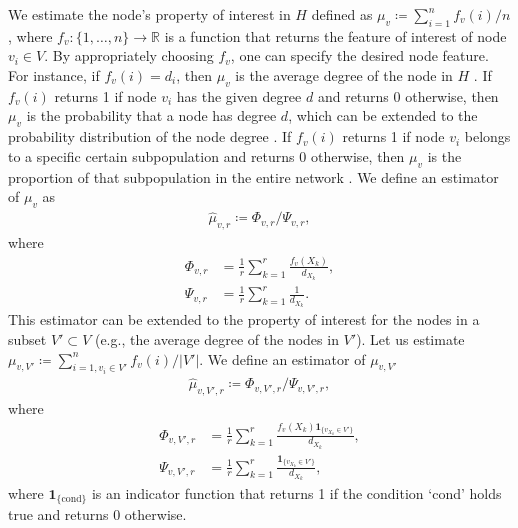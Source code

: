 We estimate the node's property of interest in $H$ defined as $\mu_{v} \coloneqq \sum_{i=1}^n f_v(i) / n$, where $f_v: \{1, \ldots, n\} \to \mathbb{R}$ is a function that returns the feature of interest of node $v_i \in V$.
By appropriately choosing $f_v$, one can specify the desired node feature.
For instance, if $f_v(i) = d_i$, then $\mu_{v}$ is the average degree of the node in $H$ \cite{gjoka2011, lee2012}. 
If $f_v(i)$ returns 1 if node $v_i$ has the given degree $d$ and returns 0 otherwise, then $\mu_{v}$ is the probability that a node has degree $d$, which can be extended to the probability distribution of the node degree \cite{gjoka2011, lee2012}.
If $f_v(i)$ returns 1 if node $v_i$ belongs to a specific certain subpopulation and returns 0 otherwise, then $\mu_{v}$ is the proportion of that subpopulation in the entire network \cite{salganik2004, gjoka2011, fukuda2022}.
We define an estimator of $\mu_{v}$ as 
\begin{align}
\hat{\mu}_{v, r} \coloneqq \Phi_{v, r} / \Psi_{v, r},
\label{eq:4}
\end{align}
where
\begin{align*}
\Phi_{v, r} &= \frac{1}{r} \sum_{k=1}^r \frac{f_v(X_k)}{d_{X_k}}, \\
\Psi_{v, r} &= \frac{1}{r} \sum_{k=1}^r \frac{1}{d_{X_k}}.
\end{align*}
This estimator can be extended to the property of interest for the nodes in a subset $V' \subset V$ (e.g., the average degree of the nodes in $V'$).
Let us estimate $\mu_{v, V'} \coloneqq \sum_{i=1, v_i \in V'}^n f_v(i) / |V'|$.
We define an estimator of $\mu_{v, V'}$
\begin{align}
\hat{\mu}_{v, V', r} \coloneqq \Phi_{v, V', r} / \Psi_{v, V', r},
\label{eq:5}
\end{align}
where
\begin{align*}
\Phi_{v, V', r} &= \frac{1}{r} \sum_{k=1}^r \frac{f_v(X_k) \bm{1}_{\{v_{X_k} \in V'\}}}{d_{X_k}}, \\
\Psi_{v, V', r} &= \frac{1}{r} \sum_{k=1}^r \frac{\bm{1}_{\{v_{X_k} \in V'\}}}{d_{X_k}},
\end{align*}
where $\bm{1}_{\{\text{cond}\}}$ is an indicator function that returns 1 if the condition `cond' holds true and returns 0 otherwise.

